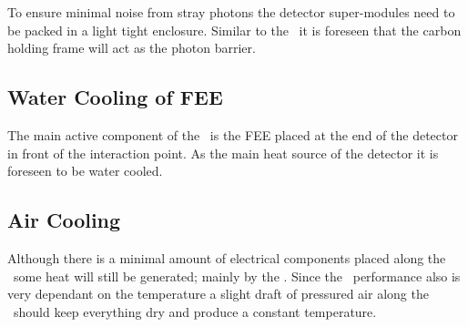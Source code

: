 \documentclass[../BTOF_summary.tex]{subfiles}
\begin{document}
To ensure minimal noise from stray photons the detector super-modules need to be packed in a light tight enclosure.
Similar to the \bdirc\ it is foreseen that the carbon holding frame will act as the photon barrier.

\subsection{Water Cooling of FEE}

The main active component of the \btofD\ is the FEE placed at the end of the detector in front of the interaction point. As the main heat source of the detector it is foreseen to be water cooled.

\subsection{Air Cooling}

Although there is a minimal amount of electrical components placed along the \railboard\ some heat will still be generated; mainly by the \sipms .
Since the \sipm\ performance also is very dependant on the temperature a slight draft of pressured air along the \railboard\ should keep everything dry and produce a constant temperature.
\end{document}
